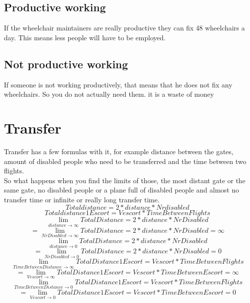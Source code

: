 \documentclass[a4paper, 11pt, notitlepage]{report}
\begin{document}
\subsection{Productive working}
If the wheelchair maintainers are really productive they can fix 48 wheelchairs a day. This means less people will have to be employed.
\subsection{Not productive working}
If someone is not working productively, that means that he does not fix any wheelchairs. So you do not actually need them. it is a waste of money
\section{Transfer}
Transfer has a few formulas with it, for example distance between the gates, amount of disabled people who need to be transferred and the time between two flights. \\
So what happens when you find the limits of those, the most distant gate or the same gate, no disabled people or a plane full of disabled people and almost no transfer time or infinite or really long transfer time.\\
\begin{equation}
Totaldistance = 2 * distance *Nrdisabled
\end{equation}
\begin{equation}
Totaldistance1Escort= Vescort * TimeBetweenFlights
\end{equation}
\begin{equation}
\lim_{distance \rightarrow \infty} TotalDistance = 2 * distance * NrDisabled
\end{equation}
\begin{equation}
 = \lim_{NrDisabled \rightarrow \infty} TotalDistance = 2 * distance * NrDisabled = \infty
\end{equation}
\begin{equation}
\lim_{distance \rightarrow 0} TotalDistance = 2 * distance * NrDisabled
\end{equation}
\begin{equation}
= \lim_{NrDisabled \rightarrow 0} TotalDistance = 2 * distance * NrDisabled = 0
\end{equation}
\begin{equation}
\lim_{TimeBetweenDistance \rightarrow \infty} TotalDistance1Escort = Vescort*TimeBetweenFlights
\end{equation}
\begin{equation}
= \lim_{Vescort \rightarrow \infty} TotalDistance1Escort = Vescort*TimeBetweenEscort = \infty
\end{equation}
\begin{equation}
\lim_{TimeBetweenDistance \rightarrow 0} TotalDistance1Escort = Vescort*TimeBetweenFlights
\end{equation}
\begin{equation}
= \lim_{Vescort \rightarrow 0} TotalDistance1Escort = Vescort*TimeBetweenEscort = 0
\end{equation}
\end{document}
